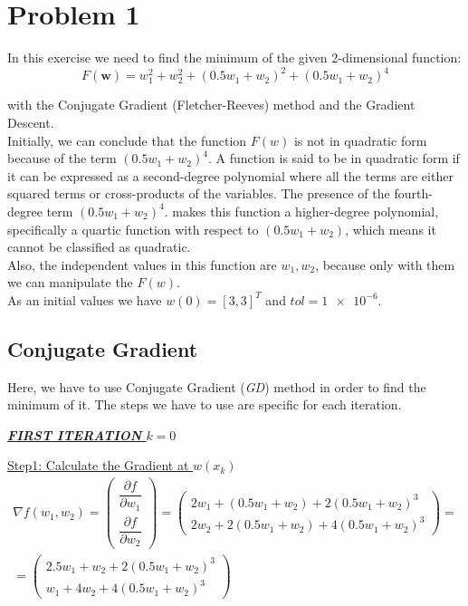 \section{Problem 1}
In this exercise we need to find the minimum of the given 2-dimensional function:\\
\begin{equation}	
		F(\mathbf{w})=w_{1}^{2}+w_{2}^{2}+(0.5w_{1}+w_{2})^{2}+(0.5w_{1}+w_{2})^{4}	
		\label{eq:function1}
\end{equation}

with the Conjugate Gradient (Fletcher-Reeves) method and the Gradient Descent.\\

Initially, we can conclude that the function $F(w)$ is not in quadratic form because of the term $(0.5w_{1}+w_{2})^{4}$.
A function is said to be in quadratic form if it can be expressed as a second-degree polynomial where all the terms are either squared terms or cross-products of the variables. The presence of the fourth-degree term $(0.5w_{1}+w_{2})^{4}$.
makes this function a higher-degree polynomial, specifically a quartic function with respect to $(0.5w_{1}+w_{2})$, which means it cannot be classified as quadratic.\\
Also, the independent values in this function are $w_{1},w_{2}$, because only with them we can manipulate the $F(w)$.\\ 

As an initial values we have $w\left(0\right) = \left[3, 3\right]^T$ and  $tol=\num{1e-6}$.\\

\subsection{Conjugate Gradient}
Here, we have to use Conjugate Gradient (\textit{GD}) method in order to find the minimum of it.
The steps we have to use are specific for each iteration.

\begin{center}
	\underline{\textit{\textbf{FIRST ITERATION} $k = 0$}}
\end{center}

\underline{Step1: Calculate the Gradient at  $w\left(x_k\right)$ }\\
\[
\begin{gathered}
	\nabla f(w_1,w_2) = \left(\begin{array}{c}
		\dfrac{\partial f}{\partial w_1} \\[4mm]
		\dfrac{\partial f}{\partial w_2}
	\end{array}\right) = \left(\begin{array}{c}
		2w_1 + (0.5w_1+w_2) + 2(0.5w_1+w_2)^3\\[1mm]
		2w_2 + 2(0.5w_1+w_2) + 4(0.5w_1+w_2)^3
	\end{array}\right) =\\= \left(\begin{array}{c}
		2.5w_1 + w_2 + 2(0.5w_1+w_2)^3\\[1mm]
		w_1 + 4w_2 + 4(0.5w_1+w_2)^3
	\end{array}\right)
\end{gathered}
\]\\[3mm]

